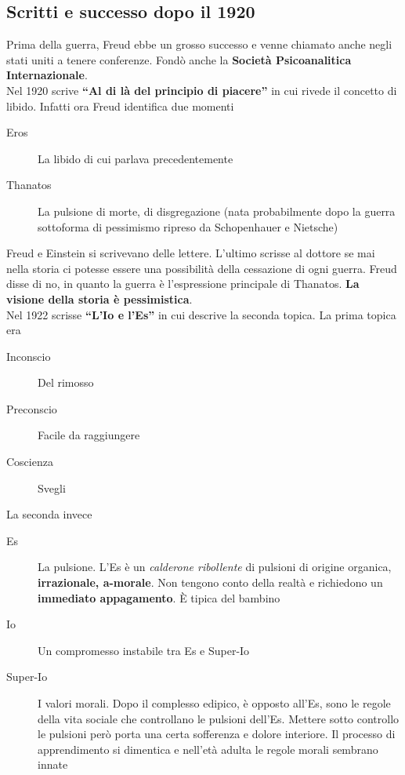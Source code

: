 \subsection{Scritti e successo dopo il 1920}
Prima della guerra, Freud ebbe un grosso successo e venne chiamato anche negli stati uniti a tenere
conferenze. Fondò anche la \textbf{Società Psicoanalitica Internazionale}.\\ [\baselineskip]
Nel 1920 scrive \textbf{``Al di là del principio di piacere''} in cui rivede il concetto di libido.
Infatti ora Freud identifica due momenti
\begin{description}
  \item[Eros] La libido di cui parlava precedentemente
  \item[Thanatos] La pulsione di morte, di disgregazione (nata probabilmente dopo la guerra 
    sottoforma di pessimismo ripreso da Schopenhauer e Nietsche)
\end{description}
Freud e Einstein si scrivevano delle lettere. L'ultimo scrisse al dottore se mai nella storia ci 
potesse essere una possibilità della cessazione di ogni guerra. Freud disse di no, in quanto la 
guerra è l'espressione principale di Thanatos. \textbf{La visione della storia è pessimistica}.\\
[\baselineskip]
Nel 1922 scrisse \textbf{``L'Io e l'Es''} in cui descrive la seconda topica. La prima topica era
\begin{description}
  \item[Inconscio] Del rimosso
  \item[Preconscio] Facile da raggiungere
  \item[Coscienza] Svegli
\end{description}
La seconda invece
\begin{description}
  \item[Es] La pulsione. L'Es è un \textit{calderone ribollente} di pulsioni di origine organica,
    \textbf{irrazionale, a-morale}. Non tengono conto della realtà e richiedono un \textbf{immediato
    appagamento}. È tipica del bambino
  \item[Io] Un compromesso instabile tra Es e Super-Io
  \item[Super-Io] I valori morali. Dopo il complesso edipico, è opposto all'Es, sono le regole della
    vita sociale che controllano le pulsioni dell'Es. Mettere sotto controllo le pulsioni però porta
    una certa sofferenza e dolore interiore. Il processo di apprendimento si dimentica e nell'età
    adulta le regole morali sembrano innate
\end{description}

